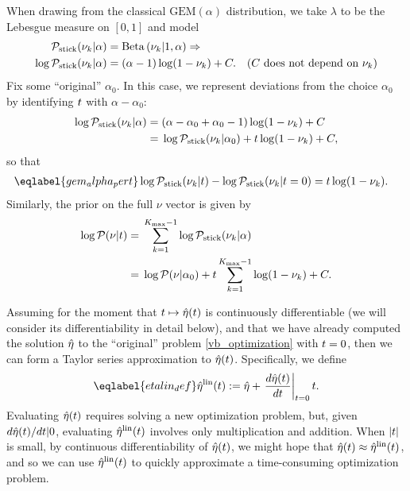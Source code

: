 \begin{ex}
%
When drawing from the classical $\mathrm{GEM}(\alpha)$ distribution, we take
$\lambda$ to be the Lebesgue measure on $[0,1]$ and model
%
\begin{align*}
%
\pstick(\nuk \vert \alpha) ={}&
    \betadist{\nuk \vert 1, \alpha} \Rightarrow\\
\log \pstick(\nuk \vert \alpha) ={}&
    (\alpha - 1) \log(1 - \nuk) + \const. &
    \constdesc{\nuk}
%
\end{align*}
%
Fix some ``original'' $\alpha_0$.  In this case, we represent deviations from
the choice $\alpha_0$ by identifying $t$ with $\alpha - \alpha_0$:
%
\begin{align*}
%
\log \pstick(\nuk \vert \alpha) ={}&
    (\alpha - \alpha_0 + \alpha_0 - 1) \log(1 - \nuk) + \const \\
%
 ={}&
    \log \pstick(\nuk \vert \alpha_0) +
    \t \log(1 - \nuk) + \const,
\end{align*}
%
so that
%
\begin{align}\eqlabel{gem_alpha_pert}
%
\log \pstick(\nuk \vert \t) - \log \pstick(\nuk \vert \t=0) ={}&
    \t \log(1 - \nuk).
%
\end{align}
%
Similarly, the prior on the full $\nu$ vector is given by
%
\begin{align*}
%
\log \p(\nu \vert \t) ={}&
    \sumkm \log \pstick(\nuk \vert \alpha)
\\={}&
    \log \p(\nu \vert \alpha_0) + \t \sumkm \log(1 - \nuk) + \const.
%
\end{align*}
%
\end{ex}

Assuming for the moment that $t \mapsto \hat\eta(t)$ is continuously
differentiable (we will consider its differentiability in detail below), and
that we have already computed the solution $\hat\eta$ to the ``original'' problem
\eqref{vb_optimization} with $t=0$, then we can form a Taylor series
approximation to $\hat\eta(t)$.  Specifically, we define
%
\begin{align}\eqlabel{etalin_def}
%
\etalin(\t) := \etaopt + \fracat{d \etaopt(\t)}{d \t}{\t=0} \t .
%
\end{align}
%
Evaluating $\hat\eta(t)$ requires solving a new optimization problem, but, given
$d\hat\eta(t) / dt | 0$, evaluating $\hat\eta^{\mathrm{lin}}(t)$ involves only
multiplication and addition.  When $|t|$ is small, by continuous
differentiability of $\hat\eta(t)$, we might hope that $\hat\eta(t) \approx
\hat\eta^{\mathrm{lin}}(t)$, and so we can use $\hat\eta^{\mathrm{lin}}(t)$ to quickly approximate a
time-consuming optimization problem.

